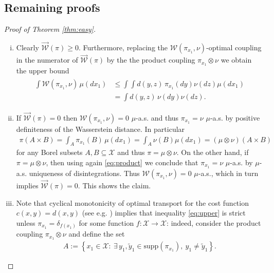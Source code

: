 \documentclass[10pt]{amsart}
\begin{document}
\begin{appendix}
\section{Remaining proofs}

\begin{proof}[Proof of Theorem \ref{thm:easy}]
\begin{enumerate}[(i)]
\item Clearly $\overrightarrow{\mathcal{W}}(\pi)\ge 0$. Furthermore, replacing the $\mathcal{W}(\pi_{x_1},\nu)$-optimal coupling in the numerator of $\overrightarrow{\mathcal{W}}(\pi)$ by the the product coupling $\pi_{x_1}\otimes \nu$ we obtain the upper bound
\begin{align}\label{eq:upper}
\begin{split}
\int \mathcal{W}(\pi_{x_1},\nu)\,\mu(dx_1)&\le \int \int d(y,z) \,\pi_{x_1}(dy)\nu(dz)\mu(dx_1)\\
&=\int d(y,z)\,\nu(dy)\nu(dz).
\end{split}
\end{align}
\item If $\overrightarrow{\mathcal{W}}(\pi)=0$ then $\mathcal{W}(\pi_{x_1}, \nu)=0$ $\mu$-a.s. and thus $\pi_{x_1}=\nu$ $\mu$-a.s. by positive definiteness of the Wasserstein distance. In particular 
\begin{align}\label{eq:product}
\pi(A\times B) =\int_A \pi_{x_1}(B) \,\mu(dx_1) =\int_A \nu(B)\mu(dx_1)= (\mu\otimes\nu)(A\times B)
\end{align}
for any Borel subsets $A,B\subseteq \mathcal{X}$ and thus $\pi=\mu\otimes\nu$. On the other hand, if $\pi=\mu\otimes\nu$, then using again \eqref{eq:product} we conclude that $\pi_{x_1}=\nu$ $\mu$-a.s. by $\mu$-a.s. uniqueness of disintegrations. Thus $\mathcal{W}(\pi_{x_1}, \nu)=0$ $\mu$-a.s., which in turn implies $\overrightarrow{\mathcal{W}}(\pi)=0$. This shows the claim.
\item Note that cyclical monotonicity of optimal transport for the cost function $c(x,y)=d(x,y)$ (see e.g. \cite[Def. 5.1]{villani2008optimal}) implies that inequality \eqref{eq:upper} is strict unless $\pi_{x_1}=\delta_{f(x_1)}$ for some function $f:\mathcal{X}\to \mathcal{X}$: indeed, consider the product coupling $\pi_{x_1}\otimes \nu$ and define the set
\begin{align*}
A:= \left\{x_1\in \mathcal{X}:\ \exists\, y_1, \tilde{y}_1 \in \text{supp}(\pi_{x_1}),\ y_1\neq \tilde{y}_1\right\}.
\end{align*}

\end{enumerate}
\end{proof}
\end{appendix}
\end{document}
